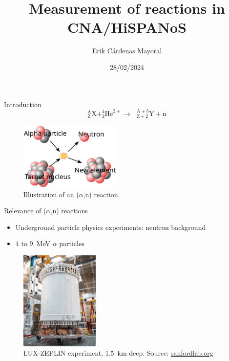 \documentclass[11pt]{beamer}
\author{Erik Cárdenas Mayoral}
\title{Measurement of \an reactions in CNA/HiSPANoS}
\institute{Inter-University Master's Degree in Nuclear Physics}
\date{28/02/2024}
\newcommand{\an}{($\alpha$,n) }
\begin{document}
\begin{frame}
\titlepage
\end{frame}


\begin{frame}{Introduction}
	\[ ^\text{A}_\text{Z}\text{X} + ^4_2\text{He}^{2+} \longrightarrow \text{ } ^{\text{A}+3}_{\text{Z}+2}\text{Y} + \text{n}     \]
	\begin{figure}[H]
		\centering
		\includegraphics[width=0.45\textwidth]{anreaction.png}
		\caption{Illustration of an \an reaction.}
		\label{anreaction}
	\end{figure}
\end{frame}

\begin{frame}{Relevance of \an reactions}
	\begin{itemize}
		\item Underground particle physics experiments: neutron background
		\item 4 to \qty{9}{\MeV} $\alpha$ particles
	\end{itemize}
	\begin{figure}[H]
		\centering
		\includegraphics[width=0.35\textwidth]{sanford.jpg}
		\caption{LUX-ZEPLIN experiment, \qty{1.5}{\kilo\meter} deep. Source: \href{https://sanfordlab.org/experiment/lux-zeplin}{sanfordlab.org}}
		\label{}
	\end{figure}
\end{frame}
\end{document}
